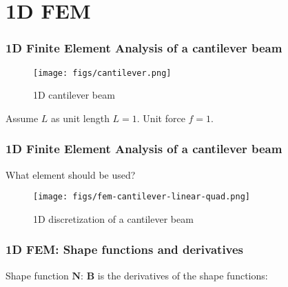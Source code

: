 \documentclass[beamer]{beamer}
\begin{document}
\section{1D FEM}
\begin{frame}
\frametitle{1D Finite Element Analysis of a cantilever beam}
\begin{figure}[ht]
	\centering
	\texttt{[image: figs/cantilever.png]}
	\caption*{1D cantilever beam}
\end{figure}
Assume $L$ as unit length $L = 1$. Unit force $f = 1$.
\end{frame}

\begin{frame}
\frametitle{1D Finite Element Analysis of a cantilever beam}
What element should be used?
\begin{figure}[ht]
	\centering
	\texttt{[image: figs/fem-cantilever-linear-quad.png]}
	\caption*{1D discretization of a cantilever beam}
\end{figure}
\end{frame}

\begin{frame}
\frametitle{1D FEM: Shape functions and derivatives}
Shape function $\mathbf{N}$:
$\mathbf{B}$ is the derivatives of the shape functions:
\end{frame}
\end{document}
